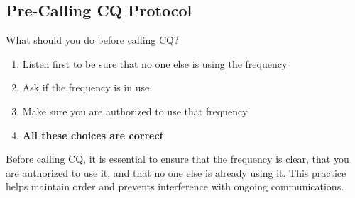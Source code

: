 \subsection{Pre-Calling CQ Protocol}
\label{T2A12}

\begin{tcolorbox}[colback=gray!10!white,colframe=black!75!black,title=T2A12]
What should you do before calling CQ?
\begin{enumerate}[noitemsep]
    \item Listen first to be sure that no one else is using the frequency
    \item Ask if the frequency is in use
    \item Make sure you are authorized to use that frequency
    \item \textbf{All these choices are correct}
\end{enumerate}
\end{tcolorbox}

Before calling CQ, it is essential to ensure that the frequency is clear, that you are authorized to use it, and that no one else is already using it. This practice helps maintain order and prevents interference with ongoing communications.